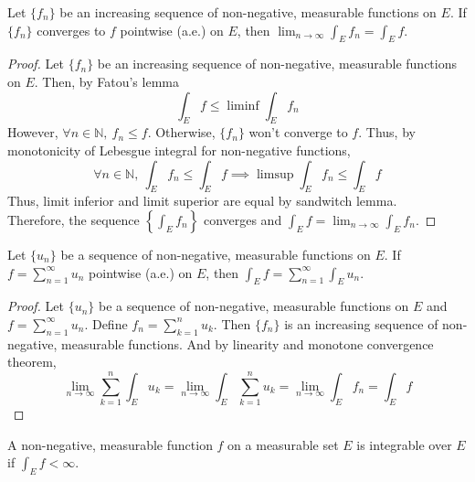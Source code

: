 \begin{theorem}
	Let $\{ f_n \}$ be an increasing sequence of non-negative, measurable functions on $E$.
	If $\{ f_n \}$ converges to $f$ pointwise (a.e.) on $E$, then $\displaystyle \lim_{n \to \infty} \int_E f_n = \int_E f$.
\end{theorem}
\begin{proof}
	Let $\{ f_n \}$ be an increasing sequence of non-negative, measurable functions on $E$.
	Then, by Fatou's lemma
	\begin{equation}
		\int_E f \le \liminf \int_E f_n
	\end{equation}
	However, $\forall n \in \mathbb{N},\ f_n \le f$.
	Otherwise, $\{ f_n \}$ won't converge to $f$.
	Thus, by monotonicity of Lebesgue integral for non-negative functions,
	\begin{equation}
		\forall n \in \mathbb{N},\ \int_E f_n \le \int_E f \implies \limsup \int_E f_n \le \int_E f
	\end{equation}
	Thus, limit inferior and limit superior are equal by sandwitch lemma.\\
	Therefore, the sequence $\displaystyle \left\{ \int_E f_n \right\}$ converges and $\displaystyle \int_E f = \lim_{n \to \infty} \int_E f_n$.
\end{proof}
\begin{corollary}
	Let $\{ u_n \}$ be a sequence of non-negative, measurable functions on $E$.
	If $\displaystyle f = \sum_{n =1}^\infty u_n$ pointwise (a.e.) on $E$, then $\displaystyle \int_E f = \sum_{n = 1}^\infty \int_E u_n$.
\end{corollary}
\begin{proof}
	Let $\{ u_n \}$ be a sequence of non-negative, measurable functions on $E$ and $f = \sum_{n = 1}^\infty u_n$.
	Define $f_n =\sum_{k = 1}^n u_k$.
	Then $\{ f_n \}$ is an increasing sequence of non-negative, measurable functions.
	And by linearity and monotone convergence theorem,
	\[ \lim_{n \to \infty} \sum_{k = 1}^n \int_E u_k = \lim_{n \to \infty} \int_E \sum_{k = 1}^n u_k = \lim_{n \to \infty} \int_E f_n = \int_E f \]
\end{proof}

\begin{definition}
	A non-negative, measurable function $f$ on a measurable set $E$ is integrable over $E$ if $\displaystyle \int_E f < \infty$.
\end{definition}

